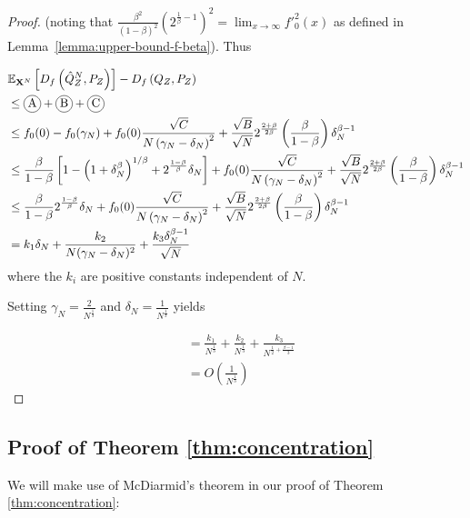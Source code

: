 \begin{proof}
(noting that $\frac{\beta^2}{(1-\beta)^2}\left(2^{\frac{1}{\beta} - 1}\right)^2 = \lim_{x\to\infty} f'^2_0(x)$ as defined in Lemma~\ref{lemma:upper-bound-f-beta}). Thus

\begin{align*}
    &\E_{\XN} \left[ D_f\left( \hat{Q}_Z^N , P_Z\right)\right] - D_f\left( Q_{Z} , P_Z\right)\\
    &\leq \encircle{A} + \encircle{B} + \encircle{C} \\
    &\leq f_0(0) - f_0(\gamma_N) + f_0(0) \frac{\sqrt{C}}{N \left( \gamma_N - \delta_N \right)^2} + \frac{\sqrt{B}}{\sqrt{N}}2^{\frac{2+\beta}{2\beta}}\left(\frac{\beta}{1-\beta}\right) \delta_N^{\beta - 1}\\
    &\leq \frac{\beta}{1-\beta}\left[1 - \left(1+\delta_N^\beta\right)^{1/\beta} + 2^{\frac{1-\beta}{\beta}}\delta_N\right] + f_0(0) \frac{\sqrt{C}}{N \left( \gamma_N - \delta_N \right)^2} + \frac{\sqrt{B}}{\sqrt{N}}2^{\frac{2+\beta}{2\beta}}\left(\frac{\beta}{1-\beta}\right) \delta_N^{\beta - 1}\\
    &\leq \frac{\beta}{1-\beta} 2^{\frac{1-\beta}{\beta}}\delta_N + f_0(0) \frac{\sqrt{C}}{N \left( \gamma_N - \delta_N \right)^2}  + \frac{\sqrt{B}}{\sqrt{N}}2^{\frac{2+\beta}{2\beta}}\left(\frac{\beta}{1-\beta}\right) \delta_N^{\beta - 1}\\
    &= k_1 \delta_N + \frac{k_2}{N(\gamma_N - \delta_N)^2} + \frac{k_3\delta_N^{\beta-1}}{\sqrt{N}}
\end{align*}
where the $k_i$ are positive constants independent of $N$.

Setting $\gamma_N = \frac{2}{N^\frac{1}{3}}$ and $\delta_N = \frac{1}{N^\frac{1}{3}}$ yields

\begin{align*}
    &= \frac{k_1}{N^{\frac{1}{3}}}
    + \frac{k_2}{N^{\frac{1}{3}}} 
    + \frac{k_3}{N^{\frac{1}{2}+\frac{\beta-1}{3}}} \\
    &= O\left(\frac{1}{N^\frac{1}{3}}\right)
\end{align*}

\end{proof}

\subsection{Proof of Theorem \ref{thm:concentration}}\label{proof:thm3}

We will make use of McDiarmid's theorem in our proof of Theorem \ref{thm:concentration}:

